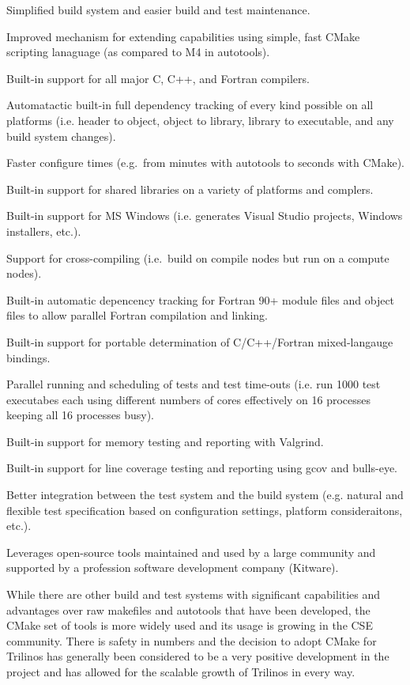 \documentclass[10pt]{article}
\begin{document}
\begin{compactitem}
\item Simplified build system and easier build and test maintenance.
\item Improved mechanism for extending capabilities using simple, fast CMake scripting lanaguage (as compared to M4 in autotools).
\item Built-in support for all major C, C++, and Fortran compilers.
\item Automatactic built-in full dependency tracking of every kind possible on all platforms (i.e. header to object, object to library, library to executable, and any build system changes).
\item Faster configure times (e.g.\ from minutes with autotools to seconds with CMake).
\item Built-in support for shared libraries on a variety of platforms and complers.
\item Built-in support for MS Windows (i.e. generates Visual Studio projects, Windows installers, etc.).
\item Support for cross-compiling (i.e.\ build on compile nodes but run on a compute nodes).
\item Built-in automatic depencency tracking for Fortran 90+ module files and object files to allow parallel Fortran compilation and linking.
\item Built-in support for portable determination of C/C++/Fortran mixed-langauge bindings.
\item Parallel running and scheduling of tests and test time-outs (i.e. run 1000 test executabes each using different numbers of cores effectively on 16 processes keeping all 16 processes busy).
\item Built-in support for memory testing and reporting with Valgrind.
\item Built-in support for line coverage testing and reporting using gcov and bulls-eye.
\item Better integration between the test system and the build system (e.g. natural and flexible test specification based on configuration settings, platform consideraitons, etc.).
\item Leverages open-source tools maintained and used by a large community and supported by a profession software development company (Kitware).
\end{compactitem}

While there are other build and test systems with significant capabilities and advantages over raw makefiles and autotools that have been developed, the CMake set of tools is more widely used and its usage is growing in the CSE community.  There is safety in numbers and the decision to adopt CMake for Trilinos has generally been considered to be a very positive development in the project and has allowed for the scalable growth of Trilinos in every way.
\end{document}
